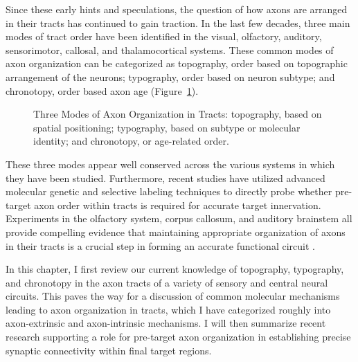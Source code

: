 Since these early hints and speculations, the question of how axons are arranged in their tracts has continued to gain traction. 
In the last few decades, three main modes of tract order have been identified in the visual, olfactory, auditory, sensorimotor, callosal, and thalamocortical systems.
These common modes of axon organization can be categorized as topography, order based on topographic arrangement of the neurons; typography, order based on neuron subtype; and chronotopy, order based axon age (Figure~\ref{AxonOrg_ThreeModes}).
\begin{figure}[hbtp]
	\makebox[\textwidth]{\framebox[5cm]{\rule{0pt}{5cm}}}
	\caption[Three Modes of Axon Organization in Tracts]{Three Modes of Axon Organization in Tracts: topography, based on spatial positioning; typography, based on subtype or molecular identity; and chronotopy, or age-related order. \label{AxonOrg_ThreeModes}}
	\end{figure}
These three modes appear well conserved across the various systems in which they have been studied.
Furthermore, recent studies have utilized advanced molecular genetic and selective labeling techniques to directly probe whether pre-target axon order within tracts is required for accurate target innervation.
Experiments in the olfactory system, corpus callosum, and auditory brainstem all provide compelling evidence that maintaining appropriate organization of axons in their tracts is a crucial step in forming an accurate functional circuit \cite{imai2009pre,zhou2013axon,michalski2013robo3}.

In this chapter, I first review our current knowledge of topography, typography, and chronotopy in the axon tracts of a variety of sensory and central neural circuits.
This paves the way for a discussion of common molecular mechanisms leading to axon organization in tracts, which I have categorized roughly into axon-extrinsic and axon-intrinsic mechanisms.
I will then summarize recent research supporting a role for pre-target axon organization in establishing precise synaptic connectivity within final target regions.